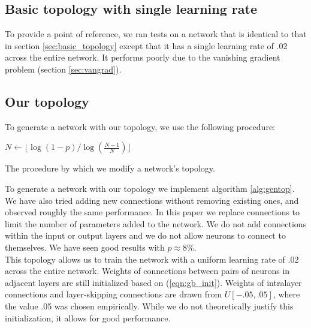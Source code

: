 \documentclass{article}
\newcommand{\npar}{\\\indent}
\begin{document}
\subsection{Basic topology with single learning rate}
\label{sec:basic_topology_uniform}

To provide a point of reference, we ran tests on a network that is identical to that in section \ref{sec:basic_topology} except that it has a single learning rate of .02 across the entire network. It performs poorly due to the vanishing gradient problem (section \ref{sec:vangrad}).

\subsection{Our topology}
\label{sec:our_topology}

To generate a network with our topology, we use the following procedure:

\begin{algorithm}
	\BlankLine
	\BlankLine
	$N\leftarrow\lfloor\log(1-p)/\log(\frac{N-1}{N})\rfloor$\;
\caption{The procedure by which we modify a network's topology.}
\label{alg:gentop}
\end{algorithm}


To generate a network with our topology we implement algorithm \ref{alg:gentop}. We have also tried adding new connections without removing existing ones, and observed roughly the same performance. In this paper we replace connections to limit the number of parameters added to the network. We do not add connections within the input or output layers and we do not allow neurons to connect to themselves. We have seen good results with $p\approx 8\%$.
\npar
This topology allows us to train the network with a uniform learning rate of .02 across the entire network. Weights of connections between pairs of neurons in adjacent layers are still initialized based on (\ref{eqn:gb_init}). Weights of intralayer connections and layer-skipping connections are drawn from $U[-.05,.05]$, where the value .05 was chosen empirically. While we do not theoretically justify this initialization, it allows for good performance.
\end{document}
